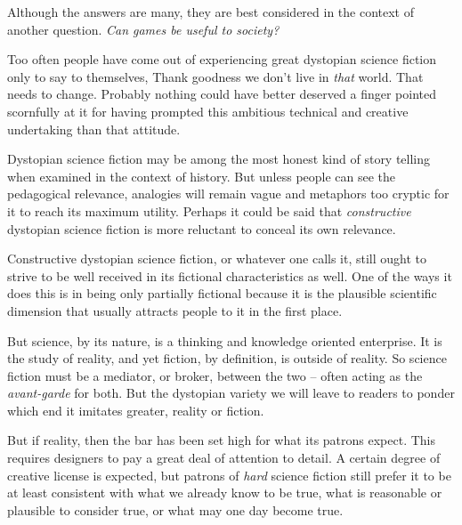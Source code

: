 

Although the answers are many, they are best considered in the context of another question. {\it Can games be useful to society?}

Too often people have come out of experiencing great dystopian science fiction only to say to themselves, Thank goodness we don't live in {\it that} world. That needs to change. Probably nothing could have better deserved a finger pointed scornfully at it for having prompted this ambitious technical and creative undertaking than that attitude.

Dystopian science fiction may be among the most honest kind of story telling when examined in the context of history. But unless people can see the pedagogical relevance, analogies will remain vague and metaphors too cryptic for it to reach its maximum utility. Perhaps it could be said that {\it constructive} dystopian science fiction is more reluctant to conceal its own relevance.

    {}

Constructive dystopian science fiction, or whatever one calls it, still ought to strive to be well received in its fictional characteristics as well. One of the ways it does this is in being only partially fictional because it is the plausible scientific dimension that usually attracts people to it in the first place.

But science, by its nature, is a thinking and knowledge oriented enterprise. It is the study of reality, and yet fiction, by definition, is outside of reality. So science fiction must be a mediator, or broker, between the two -- often acting as the {\it avant-garde} for both. But the dystopian variety we will leave to readers to ponder which end it imitates greater, reality or fiction.

But if reality, then the bar has been set high for what its patrons expect. This requires designers to pay a great deal of attention to detail. A certain degree of creative license is expected, but patrons of {\it hard} science fiction still prefer it to be at least consistent with what we already know to be true, what is reasonable or plausible to consider true, or what may one day become true.

